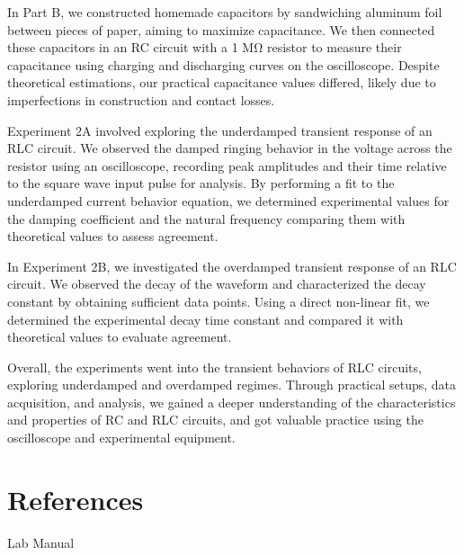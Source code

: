 \documentclass[11pt]{article}
\let\oldsection\section
\renewcommand\section{\clearpage\oldsection}
\begin{document}
    In Part B, we constructed homemade capacitors by sandwiching aluminum foil between pieces of paper, aiming to maximize capacitance. We then connected these capacitors in an RC circuit with a 1 MΩ resistor to measure their capacitance using charging and discharging curves on the oscilloscope. Despite theoretical estimations, our practical capacitance values differed, likely due to imperfections in construction and contact losses.

    Experiment 2A involved exploring the underdamped transient response of an RLC circuit. We observed the damped ringing behavior in the voltage across the resistor using an oscilloscope, recording peak amplitudes and their time relative to the square wave input pulse for analysis. By performing a fit to the underdamped current behavior equation, we determined experimental values for the damping coefficient and the natural frequency comparing them with theoretical values to assess agreement.

    In Experiment 2B, we investigated the overdamped transient response of an RLC circuit. We observed the decay of the waveform and characterized the decay constant by obtaining sufficient data points. Using a direct non-linear fit, we determined the experimental decay time constant and compared it with theoretical values to evaluate agreement.
    
    Overall, the experiments went into the transient behaviors of RLC circuits, exploring underdamped and overdamped regimes. Through practical setups, data acquisition, and analysis, we gained a deeper understanding of the characteristics and properties of RC and RLC circuits, and got valuable practice using the oscilloscope and experimental equipment.
    
    

    \appendix
    \section{References}\label{sec:references}

    Lab Manual
\end{document}
